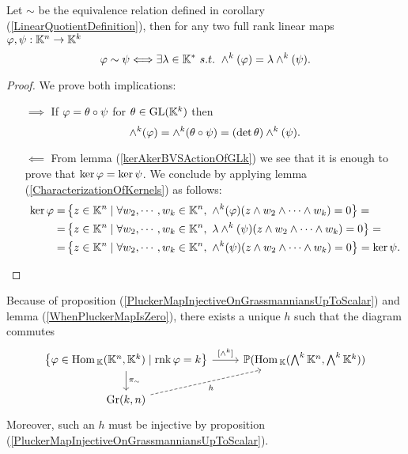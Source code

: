 \begin{proposition}\label{PluckerMapInjectiveOnGrassmanniansUpToScalar}
Let $\sim$ be the equivalence relation defined in corollary (\ref{LinearQuotientDefinition}), then for any two full rank linear maps $\varphi,\psi:\mathbb{K}^n\to \mathbb{K}^k$
\[\vp\sim \psi\coimplies \exists \la\in\K^\ast\ s.t.\ \wedge^k(\vp)=\la\wedge^k(\psi).\]
\end{proposition}
\begin{proof}
We prove both implications:
\setlength{\leftmargini}{0cm}
\begin{itemize}
\item[$\boxed{\implies}$] If $\varphi=\theta\circ \psi$ for $\theta\in \mathrm{GL}(\mathbb{K}^k)$ then
\[\wedge^k(\varphi)=\wedge^k(\theta\circ \psi)=(\det\theta) \wedge^k(\psi).\]
\item[$\boxed{\impliedby}$] From lemma (\ref{kerAkerBVSActionOfGLk}) we see that it is enough to prove that $\ker \varphi=\ker \psi$. We conclude by applying lemma (\ref{CharacterizationOfKernels}) as follows:
\begin{align*}
\ker\vp=&\cpa{z\in\K^n\mid \forall w_2,\cdots, w_k\in \K^n,\ \wedge^k(\vp)(z\wedge w_2\wedge \cdots\wedge w_k)=0}=\\
=&\cpa{z\in\K^n\mid \forall w_2,\cdots, w_k\in \K^n,\ \la\wedge^k(\psi)(z\wedge w_2\wedge\cdots\wedge w_k)=0}=\\
=&\cpa{z\in\K^n\mid \forall w_2,\cdots, w_k\in \K^n,\ \wedge^k(\psi)(z\wedge w_2\wedge \cdots\wedge w_k)=0}=\ker \psi.
\end{align*}
\end{itemize}
\setlength{\leftmargini}{0.5cm}
\end{proof}

\begin{remark}
Because of proposition (\ref{PluckerMapInjectiveOnGrassmanniansUpToScalar}) and lemma (\ref{WhenPluckerMapIsZero}), there exists a unique $h$ such that the diagram commutes
\[\begin{tikzcd}
	{\cpa{\vp\in \Hom_\K(\K^n,\K^k)\mid \rnk \vp=k}} & {\Pj(\Hom_\K(\bigwedge^k\K^n,\bigwedge^k\K^k))} \\
	{\Gr(k,n)}
	\arrow["\pi_\sim", from=1-1, to=2-1]
	\arrow["{[\wedge^k]}", from=1-1, to=1-2]
	\arrow["h"', dashed, from=2-1, to=1-2]
\end{tikzcd}\]
Moreover, such an $h$ must be injective by proposition (\ref{PluckerMapInjectiveOnGrassmanniansUpToScalar}).
\end{remark}


